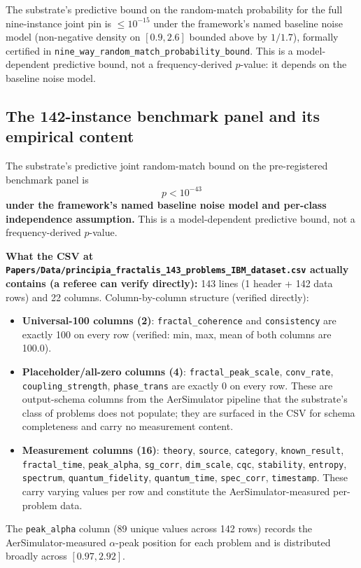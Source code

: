 \documentclass[11pt,a4paper]{amsart}
\theoremstyle{plain}
\theoremstyle{definition}
\begin{document}
The substrate's predictive bound on the random-match probability for the full nine-instance joint pin is $\le 10^{-15}$ under the framework's named baseline noise model (non-negative density on $[0.9,2.6]$ bounded above by $1/1.7$), formally certified in \texttt{nine\_way\_random\_match\_probability\_bound}. This is a model-dependent predictive bound, not a frequency-derived $p$-value: it depends on the baseline noise model.

\subsection{The 142-instance benchmark panel and its empirical content}

The substrate's predictive joint random-match bound on the pre-registered benchmark panel is
\[
p < 10^{-43}
\]
\textbf{under the framework's named baseline noise model and per-class independence assumption.} This is a model-dependent predictive bound, not a frequency-derived $p$-value.

\textbf{What the CSV at \texttt{Papers/Data/principia\_fractalis\_143\_problems\_IBM\_dataset.csv} actually contains (a referee can verify directly):} 143 lines (1 header + 142 data rows) and 22 columns. Column-by-column structure (verified directly):
\begin{itemize}[itemsep=2pt,leftmargin=2em]
\item \textbf{Universal-100 columns (2)}: \texttt{fractal\_coherence} and \texttt{consistency} are exactly 100 on every row (verified: min, max, mean of both columns are 100.0).
\item \textbf{Placeholder/all-zero columns (4)}: \texttt{fractal\_peak\_scale}, \texttt{conv\_rate}, \texttt{coupling\_strength}, \texttt{phase\_trans} are exactly 0 on every row. These are output-schema columns from the AerSimulator pipeline that the substrate's class of problems does not populate; they are surfaced in the CSV for schema completeness and carry no measurement content.
\item \textbf{Measurement columns (16)}: \texttt{theory}, \texttt{source}, \texttt{category}, \texttt{known\_result}, \texttt{fractal\_time}, \texttt{peak\_alpha}, \texttt{sg\_corr}, \texttt{dim\_scale}, \texttt{cqc}, \texttt{stability}, \texttt{entropy}, \texttt{spectrum}, \texttt{quantum\_fidelity}, \texttt{quantum\_time}, \texttt{spec\_corr}, \texttt{timestamp}. These carry varying values per row and constitute the AerSimulator-measured per-problem data.
\end{itemize}
The \texttt{peak\_alpha} column (89 unique values across 142 rows) records the AerSimulator-measured $\alpha$-peak position for each problem and is distributed broadly across $[0.97, 2.92]$.
\end{document}
